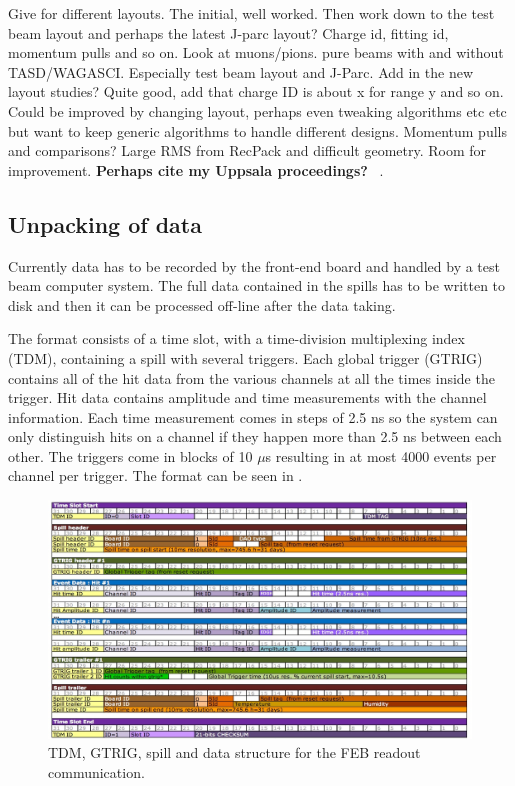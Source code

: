 Give for different layouts. The initial, well worked. Then work down to the test beam layout and perhaps the latest J-parc layout? 
Charge id, fitting id, momentum pulls and so on.
Look at muons/pions. pure beams with and without TASD/WAGASCI. Especially test beam layout and J-Parc.
Add in the new layout studies?
Quite good, add that charge ID is about x for range y and so on.  Could be improved by changing layout, perhaps even tweaking algorithms etc etc but want to keep generic algorithms to handle different designs.
Momentum pulls and comparisons? Large RMS from RecPack and difficult geometry. Room for improvement.
\textbf{Perhaps cite my Uppsala proceedings?} ~\cite{82Uppsala}.
\fi

\subsection{Unpacking of data}


Currently data has to be recorded by the front-end board and handled by a test beam computer system. The full data contained in the spills has to be written to disk and then it can be processed off-line after the data taking.

The format consists of a time slot, with a time-division multiplexing index (TDM), containing a spill with several triggers. Each global trigger (GTRIG) contains all of the hit data from the various channels at all the times inside the trigger. Hit data contains amplitude and time measurements with the channel information.
Each time measurement comes in steps of 2.5 ns so the system can only distinguish hits on a channel if they happen more than 2.5 ns between each other. The triggers come in blocks of 10 $\mu$s resulting in at most 4000 events per channel per trigger. The format can be seen in .


\begin{figure}[h!]
\centering
\includegraphics[width=\textwidth]{figures/febstructure.jpeg}
\caption{TDM, GTRIG, spill and data structure for the FEB readout communication.}
\label{fig:FEBstructure}
\end{figure}

